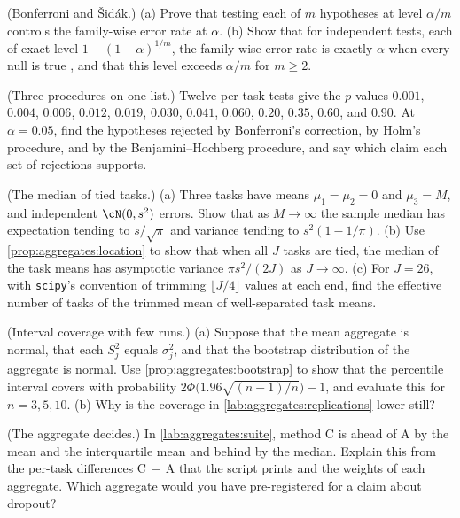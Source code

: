 \begin{refsection}
\begin{exercises}
\item \consolidation (Bonferroni and \v{S}id\'ak.) (a) Prove that testing each of $m$ hypotheses at level $\alpha/m$ controls the family-wise error rate at $\alpha$. (b) Show that for independent tests, each of exact level $1-(1-\alpha)^{1/m}$, the family-wise error rate is exactly $\alpha$ when every null is true \parencite{Sidak1967}, and that this level exceeds $\alpha/m$ for $m\ge2$.\label{ex:aggregates:sidak}

\item \consolidation (Three procedures on one list.) Twelve per-task tests give the $p$-values $0.001$, $0.004$, $0.006$, $0.012$, $0.019$, $0.030$, $0.041$, $0.060$, $0.20$, $0.35$, $0.60$, and $0.90$. At $\alpha=0.05$, find the hypotheses rejected by Bonferroni's correction, by Holm's procedure, and by the Benjamini--Hochberg procedure, and say which claim each set of rejections supports.\label{ex:aggregates:three}

\item \consolidation (The median of tied tasks.) (a) Three tasks have means $\mu_1=\mu_2=0$ and $\mu_3=M$, and independent $\cN(0,s^2)$ errors. Show that as $M\to\infty$ the sample median has expectation tending to $s/\sqrt\pi$ and variance tending to $s^2(1-1/\pi)$. (b) Use \cref{prop:aggregates:location} to show that when all $J$ tasks are tied, the median of the task means has asymptotic variance $\pi s^2/(2J)$ as $J\to\infty$. (c) For $J=26$, with \texttt{scipy}'s convention of trimming $\lfloor J/4\rfloor$ values at each end, find the effective number of tasks of the trimmed mean of well-separated task means.\label{ex:aggregates:tied}

\item \consolidation (Interval coverage with few runs.) (a) Suppose that the mean aggregate is normal, that each $S_j^2$ equals $\sigma_j^2$, and that the bootstrap distribution of the aggregate is normal. Use \cref{prop:aggregates:bootstrap} to show that the percentile interval covers with probability $2\Phi\bigl(1.96\sqrt{(n-1)/n}\bigr)-1$, and evaluate this for $n=3,5,10$. (b) Why is the coverage in \cref{lab:aggregates:replications} lower still?\label{ex:aggregates:coverage}

\item \labwork (The aggregate decides.) In \cref{lab:aggregates:suite}, method C is ahead of A by the mean and the interquartile mean and behind by the median. Explain this from the per-task differences C$\,-\,$A that the script prints and the weights of each aggregate. Which aggregate would you have pre-registered for a claim about dropout?\label{ex:aggregates:dropout}


\end{exercises}
\end{refsection}
